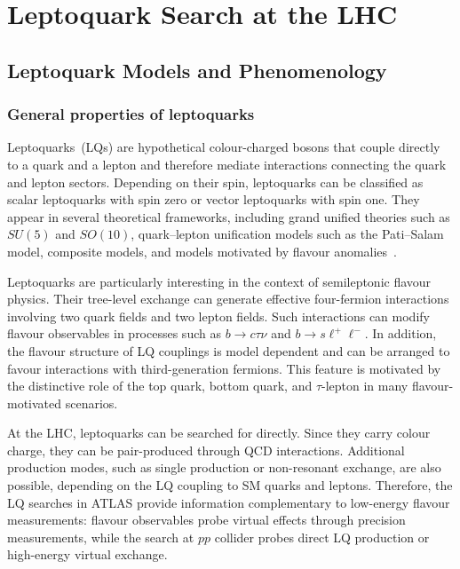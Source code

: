 \chapter{Leptoquark Search at the LHC}
\label{chapter:LQ_search}

\section{Leptoquark Models and Phenomenology}
\label{sec:leptoquarks}

\subsection{General properties of leptoquarks}
\label{subsec:lq_general}

Leptoquarks~(LQs) are hypothetical colour-charged bosons that couple directly to a quark and a lepton and therefore mediate interactions connecting the quark and lepton sectors.
Depending on their spin, leptoquarks can be classified as scalar leptoquarks with spin zero or vector leptoquarks with spin one. 
They appear in several theoretical frameworks, including grand unified theories such as $SU(5)$ and $SO(10)$, quark--lepton unification models such as the Pati--Salam model, composite models, and models motivated by flavour anomalies~\cite{GeorgiGlashow1974SU5,PatiSalam1974,Dorsner2016}.


Leptoquarks are particularly interesting in the context of semileptonic flavour physics. 
Their tree-level exchange can generate effective four-fermion interactions involving two quark fields and two lepton fields. 
Such interactions can modify flavour observables in processes such as $b\rightarrow c\tau\nu$ and $b\rightarrow s\ell^{+}\ell^{-}$. 
In addition, the flavour structure of LQ couplings is model dependent and can be arranged to favour interactions with third-generation fermions. 
This feature is motivated by the distinctive role of the top quark, bottom quark, and $\tau$-lepton in many flavour-motivated scenarios.

At the LHC, leptoquarks can be searched for directly. 
Since they carry colour charge, they can be pair-produced through QCD interactions. 
Additional production modes, such as single production or non-resonant exchange, are also possible, depending on the LQ coupling to SM quarks and leptons. 
Therefore, the LQ searches in ATLAS provide information complementary to low-energy flavour measurements: flavour observables probe virtual effects through precision measurements, while the search at $pp$ collider probes direct LQ production or high-energy virtual exchange.

